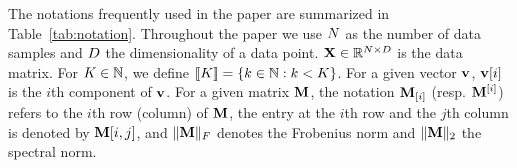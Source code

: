 
The notations frequently used in the paper are summarized in Table~\ref{tab:notation}. 
%
Throughout the paper we use $N$ as the number of data samples and $D$ the dimensionality of a data point. 
${\mathbf{X}} \in \mathbb{R}^{N \times D}$ is the data matrix. 
For $K \in {\mathbb{N}}$, we define $[\![K]\!]=\left \lbrace k\in {\mathbb{N}}: k < K\right \rbrace$.
%
For a given vector ${\mathbf{v}}$, ${\mathbf{v}}[i]$ is the $i$th component of ${\mathbf{v}}$.
%
For a given matrix ${\mathbf{M}}$, the notation ${\mathbf{M}}_{[i]}$ (resp. ${\mathbf{M}}^{[i]}$) refers to the $i$th row (column) of ${\mathbf{M}}$, the entry at the $i$th row and the $j$th column is denoted by ${\mathbf{M}}[i,j]$, and $\|{\mathbf{M}}\|_F$ denotes the Frobenius norm and $\|{\mathbf{M}}\|_2$ the spectral norm. 




